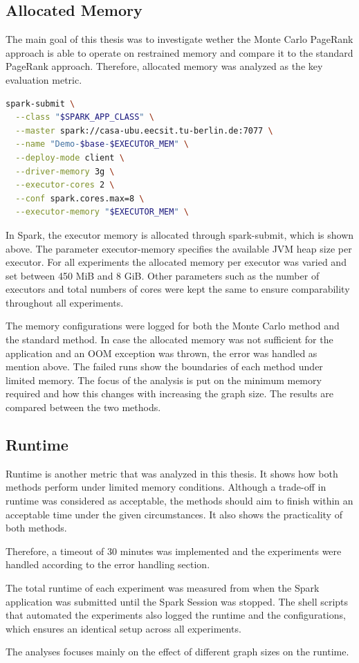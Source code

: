 \subsection{Allocated Memory}
The main goal of this thesis was to investigate wether the Monte Carlo PageRank approach is able to operate on restrained memory and compare it to the standard PageRank approach. Therefore, allocated memory was analyzed as the key evaluation metric. 
\vspace{0.5em}
\begin{lstlisting}[language=bash, caption={Spark-submit command}]
spark-submit \
  --class "$SPARK_APP_CLASS" \
  --master spark://casa-ubu.eecsit.tu-berlin.de:7077 \
  --name "Demo-$base-$EXECUTOR_MEM" \
  --deploy-mode client \
  --driver-memory 3g \
  --executor-cores 2 \
  --conf spark.cores.max=8 \
  --executor-memory "$EXECUTOR_MEM" \
\end{lstlisting}
\vspace{0.5em}
In Spark, the executor memory is allocated through spark-submit, which is shown above. The parameter executor-memory specifies the available JVM heap size per executor. For all experiments the allocated memory per executor was varied and set between 450 MiB and 8 GiB. Other parameters such as the number of executors and total numbers of cores were kept the same to ensure comparability throughout all experiments.\par
The memory configurations were logged for both the Monte Carlo method and the standard method. In case the allocated memory was not sufficient for the application and an OOM exception was thrown, the error was handled as mention above. The failed runs show the boundaries of each method under limited memory. The focus of the analysis is put on the minimum memory required and how this changes with increasing the graph size. The results are compared between the two methods. \par





\subsection{Runtime}
Runtime is another metric that was analyzed in this thesis. It shows how both methods perform under limited memory conditions. Although a trade-off in runtime was considered as acceptable, the methods should aim to finish within an acceptable time under the given circumstances. It also shows the practicality of both methods.\par
Therefore, a timeout of 30 minutes was implemented and the experiments were handled according to the error handling section.\par 
The total runtime of each experiment was measured from when the Spark application was submitted until the Spark Session was stopped. The shell scripts that automated the experiments also logged the runtime and the configurations, which ensures an identical setup across all experiments.\par
The analyses focuses mainly on the effect of different graph sizes on the runtime. 


